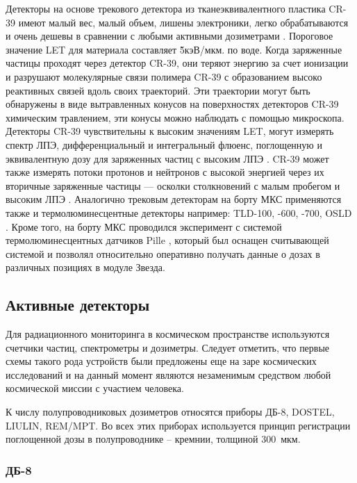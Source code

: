 Детекторы на основе трекового детектора из  тканеэквивалентного пластика CR-39 имеют малый вес, малый объем, лишены электроники, легко обрабатываются и очень дешевы в сравнении с любыми активными дозиметрами \cite{Zhou2008}. Пороговое значение LET для материала составляет \~ 5кэВ/мкм. по воде. Когда заряженные частицы проходят через детектор CR-39, они теряют энергию за счет ионизации и разрушают молекулярные связи полимера CR-39 с образованием высоко реактивных связей вдоль своих траекторий. Эти траектории могут быть обнаружены в виде вытравленных конусов на поверхностях детекторов CR-39 химическим травлением, эти конусы можно наблюдать с помощью микроскопа. Детекторы CR-39 чувствительны к высоким значениям LET, могут измерять спектр ЛПЭ, дифференциальный и интегральный флюенс, поглощенную и эквивалентную дозу для заряженных частиц с высоким ЛПЭ \cite{Zhou2008}. CR-39 может также измерять потоки протонов и нейтронов с высокой энергией через их вторичные заряженные частицы --- осколки столкновений с малым пробегом и высоким ЛПЭ \cite{Zhou2008}.
Аналогично трековым детекторам на борту МКС применяются также и термолюминесцентные детекторы например: TLD-100, -600, -700, OSLD  \cite{Zhou2010}. Кроме того, на борту МКС проводился эксперимент с системой термолюминесцентных датчиков Pille \cite{Apathy2007}, который был оснащен считывающей системой и позволял относительно оперативно получать данные о дозах в различных позициях в модуле Звезда.

\subsection{Активные детекторы} \label{subsect1_3_2}

Для радиационного мониторинга в космическом пространстве используются счетчики частиц, спектрометры и дозиметры. Следует отметить, что первые схемы такого рода устройств были предложены еще на заре космических исследований \cite{Markelov1982,Markelov1978} и на данный момент являются незаменимым средством любой космической миссии с участием человека.

К числу полупроводниковых дозиметров относятся приборы ДБ-8, DOSTEL, LIULIN, REM/MPT. Во всех этих приборах используется принцип регистрации поглощенной дозы в полупроводнике – кремнии, толщиной 300~мкм.  

\subsubsection{ДБ-8}

